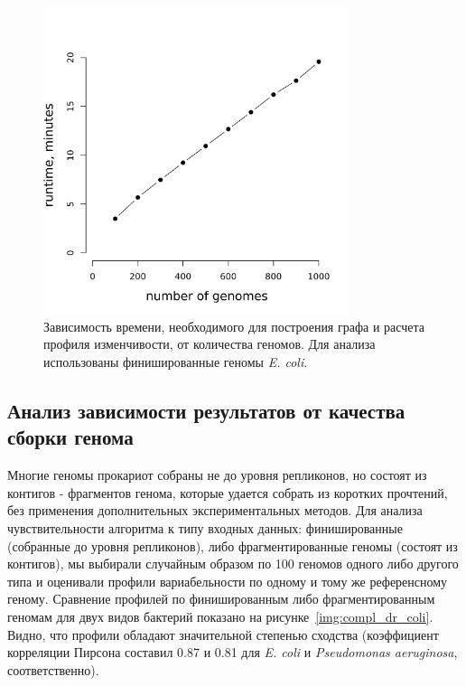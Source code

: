 \begin{figure}[!ht] 
  \center
    \includegraphics[width=0.8\textwidth]{Dissertation/images/complexity/runtime_nocoalign.png}
  \caption{Зависимость времени, необходимого для построения графа и расчета профиля изменчивости, от количества геномов. Для анализа использованы финишированные геномы \textit{E. coli}. }
  \label{img:complex_runtime} 
\end{figure}

\subsection{Анализ зависимости результатов от качества сборки генома}

Многие геномы прокариот собраны не до уровня репликонов, но состоят из контигов - фрагментов генома, которые удается собрать из коротких прочтений, без применения дополнительных экспериментальных методов. 
Для анализа чувствительности алгоритма к типу входных данных: финишированные (собранные до уровня репликонов), либо фрагментированные геномы (состоят из контигов), мы выбирали случайным образом по 100 геномов одного либо другого типа и оценивали профили вариабельности по одному и тому же референсному геному. Сравнение профилей по финишированным либо фрагментированным геномам для двух видов бактерий показано на рисунке~\ref{img:compl_dr_coli}. Видно, что профили обладают значительной степенью сходства (коэффициент корреляции Пирсона составил 0.87 и 0.81 для \textit{E. coli} и \textit{Pseudomonas aeruginosa}, соответственно). 

